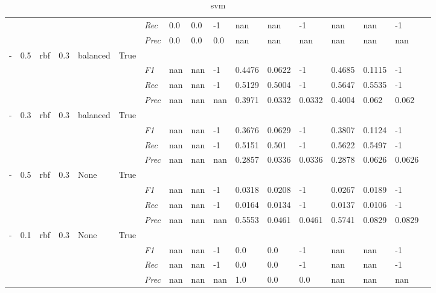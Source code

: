 \begin{table}[]
\begin{tabularx}{\textwidth}{XXXXXX|X|XXX|XXX|XXXX}
& & & & & & \textit{Rec} & 0.0 & 0.0 & -1    & nan & nan    & -1    & nan    & nan    & -1    \\
& & & & & & \textit{Prec} & 0.0 & 0.0 & 0.0 & nan & nan & nan & nan & nan & nan \\ \midrule
- & 0.5 & rbf & 0.3 & balanced &True & & & & & & & & & \\
& & & & & & \textit{F1} & nan & nan & -1 & 0.4476 & 0.0622        & -1        & 0.4685        & 0.1115        & -1        \\
& & & & & & \textit{Rec} & nan & nan & -1    & 0.5129 & 0.5004    & -1    & 0.5647    & 0.5535    & -1    \\
& & & & & & \textit{Prec} & nan & nan & nan & 0.3971 & 0.0332 & 0.0332 & 0.4004 & 0.062 & 0.062 \\ \midrule
- & 0.3 & rbf & 0.3 & balanced &True & & & & & & & & & \\
& & & & & & \textit{F1} & nan & nan & -1 & 0.3676 & 0.0629        & -1        & 0.3807        & 0.1124        & -1        \\
& & & & & & \textit{Rec} & nan & nan & -1    & 0.5151 & 0.501    & -1    & 0.5622    & 0.5497    & -1    \\
& & & & & & \textit{Prec} & nan & nan & nan & 0.2857 & 0.0336 & 0.0336 & 0.2878 & 0.0626 & 0.0626 \\ \midrule
- & 0.5 & rbf & 0.3 & None &True & & & & & & & & & \\
& & & & & & \textit{F1} & nan & nan & -1 & 0.0318 & 0.0208        & -1        & 0.0267        & 0.0189        & -1        \\
& & & & & & \textit{Rec} & nan & nan & -1    & 0.0164 & 0.0134    & -1    & 0.0137    & 0.0106    & -1    \\
& & & & & & \textit{Prec} & nan & nan & nan & 0.5553 & 0.0461 & 0.0461 & 0.5741 & 0.0829 & 0.0829 \\ \midrule
- & 0.1 & rbf & 0.3 & None &True & & & & & & & & & \\
& & & & & & \textit{F1} & nan & nan & -1 & 0.0 & 0.0        & -1        & nan        & nan        & -1        \\
& & & & & & \textit{Rec} & nan & nan & -1    & 0.0 & 0.0    & -1    & nan    & nan    & -1    \\
& & & & & & \textit{Prec} & nan & nan & nan & 1.0 & 0.0 & 0.0 & nan & nan & nan \\ \midrule
\end{tabularx}
\caption{svm}
\label{tab:all_results_svm}
\end{table}
